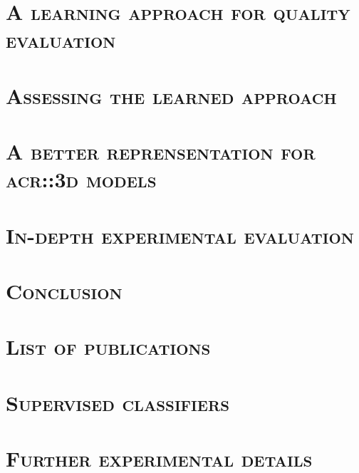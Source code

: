 \documentclass[12pt, twoside]{book}
\begin{document}
    \chapter{\textsc{A learning approach for quality evaluation}}
        \label{chap::learned_evaluation}
        

    \chapter{\textsc{Assessing the learned approach}}
        \label{chap::experiments}
        

    \chapter{\textsc{A better reprensentation for \texorpdfstring{\gls*{acr::3d}}{3D} models}}
        \label{chap::better_reprensentation}
        

    \chapter{\textsc{In-depth experimental evaluation}}
        \label{chap::more_experiments}
        

    \chapter{\textsc{Conclusion}}
        \label{chap::conclusion}
        

    \appendix
    \chapter{\textsc{List of publications}}
        
    \chapter{\textsc{Supervised classifiers}}
        
    \chapter{\textsc{Further experimental details}}
        

    
    \printbibliography[heading=bibintoc]
    
    
\end{document}
